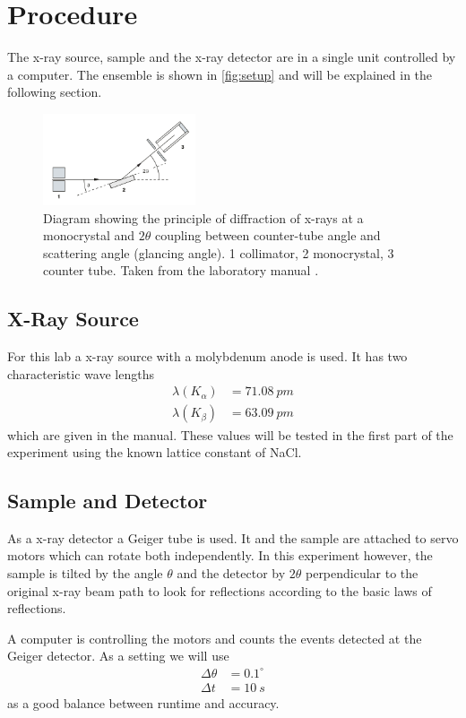 \section{Procedure}
\label{sec:procedure}
The x-ray source, sample and the x-ray detector are in a single unit controlled by a computer. The
ensemble is shown in \autoref{fig:setup} and will be explained in the following section.

\begin{figure}
  \centering
  \includegraphics[width=0.4\textwidth]{media/setup.png}
  \caption{Diagram showing the principle of diffraction of x-rays at a
    monocrystal and $2\theta$ coupling between counter-tube angle
    and scattering angle (glancing angle).
    1 collimator, 2 monocrystal, 3 counter tube. Taken from the laboratory manual
  \cite{leybold_manual2}.}
  \label{fig:setup}
\end{figure}

\subsection{X-Ray Source}
\label{sec:X-Ray Source}
For this lab a x-ray source with a molybdenum anode is used. It has two characteristic wave lengths 
\begin{align*}
  \lambda (K_\alpha) &= \SI{71.08}{pm} \\
  \lambda (K_\beta) &= \SI{63.09}{pm}
\end{align*}
which are given in the manual. These values will be tested in the first part of the experiment using
the known lattice constant of NaCl.

\subsection{Sample and Detector}
\label{sec:Sample and Detector}
As a x-ray detector a Geiger tube is used. It and the sample are attached to servo motors which can
rotate both independently. In this experiment however, the sample is tilted by the angle $\theta$
and the detector by $2\theta$ perpendicular to the original x-ray beam path to look for reflections
according to the basic laws of reflections.

A computer is controlling the motors and counts the events detected at the Geiger detector. As a
setting we will use
\begin{align*}
  \Delta \theta &= 0.1^\circ \\
  \Delta t &= \SI{10}{s}
\end{align*}
as a good balance between runtime and accuracy.

